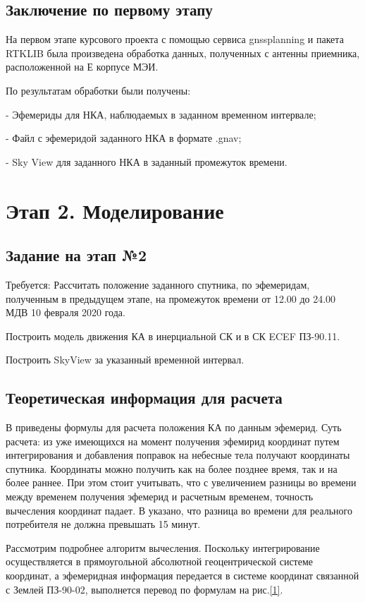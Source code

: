 \documentclass[]{article}
\begin{document}
\subsection{Заключение по первому этапу}
На первом этапе курсового проекта с помощью сервиса gnssplanning и пакета RTKLIB была произведена обработка данных, полученных с антенны приемника, расположенной на Е корпусе МЭИ.

По результатам обработки были получены:

- Эфемериды для НКА, наблюдаемых в заданном временном интервале;

- Файл с эфемеридой заданного НКА в формате .gnav;

- Sky View для заданного НКА в заданный промежуток времени.

\newpage
\section{Этап 2. Моделирование}
	\subsection{Задание на этап №2}
	Требуется:
	Рассчитать положение заданного спутника, по эфемеридам, полученным в предыдущем этапе, на промежуток времени от 12.00 до 24.00 МДВ 10 февраля 2020 года. 
	
	Построить модель движения КА в инерциальной СК и в СК ECEF ПЗ-90.11. 
	
	Построить SkyView за указанный временной интервал.

	\subsection{Теоретическая информация для расчета}
	В \cite{ICD} приведены формулы для расчета положения КА по данным эфемерид. Суть расчета: из уже имеющихся на момент получения эфемирид координат путем интегрирования и добавления поправок на небесные тела получают координаты спутника. Координаты можно получить как на более позднее время, так и на более раннее. При этом стоит учитывать, что с увеличением разницы во времени между временем получения эфемерид и расчетным временем, точность вычесления координат падает. В \cite{ICD} указано, что разница во времени для реального потребителя не должна превышать 15 минут.  
	
	Рассмотрим подробнее  алгоритм вычесления.
	Поскольку интегрирование осуществляется в прямоугольной абсолютной геоцентрической системе координат, а эфемеридная информация передается в системе координат связанной с Землей  ПЗ-90-02, выполнется перевод по формулам на рис.\ref{1}.
	
\end{document}
